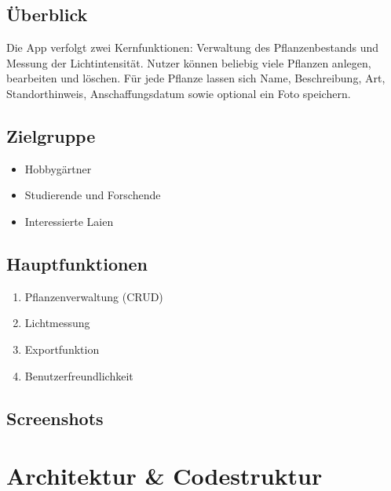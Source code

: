 \documentclass[14pt,a4paper]{report}
\begin{document}
\section{Überblick}
Die App verfolgt zwei Kernfunktionen: Verwaltung des Pflanzenbestands und Messung der Lichtintensität. Nutzer können beliebig viele Pflanzen anlegen, bearbeiten und löschen. Für jede Pflanze lassen sich Name, Beschreibung, Art, Standorthinweis, Anschaffungsdatum sowie optional ein Foto speichern. 

\section{Zielgruppe}
\begin{itemize}
    \item Hobbygärtner
    \item Studierende und Forschende
    \item Interessierte Laien
\end{itemize}

\section{Hauptfunktionen}
\begin{enumerate}
    \item Pflanzenverwaltung (CRUD)
    \item Lichtmessung
    \item Exportfunktion
    \item Benutzerfreundlichkeit
\end{enumerate}

\section{Screenshots}

\chapter{Architektur \& Codestruktur}
\end{document}
